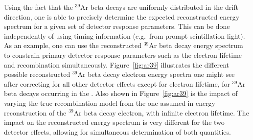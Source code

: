 Using the fact that the ${}^{39}$Ar beta decays are uniformly distributed in the drift direction, one is able to precisely determine the expected reconstructed energy spectrum for a given set of detector response parameters. This can be done independently of using timing information (e.g.~from prompt scintillation light). As an example, one can use the reconstructed ${}^{39}$Ar beta decay energy spectrum to constrain primary detector response parameters such as the electron lifetime and recombination simultaneously. Figure~\ref{fig:ar39} illustrates the different possible reconstructed ${}^{39}$Ar beta decay electron energy spectra one might see after correcting for all other detector effects except for electron lifetime, for ${}^{39}$Ar beta decays occurring in the . Also shown in Figure~\ref{fig:ar39} is the impact of varying the true recombination model from the one assumed in energy reconstruction of the ${}^{39}$Ar beta decay electron, with infinite electron lifetime. The impact on the reconstructed energy spectrum is very different for the two detector effects, allowing for simultaneous determination of both quantities.

